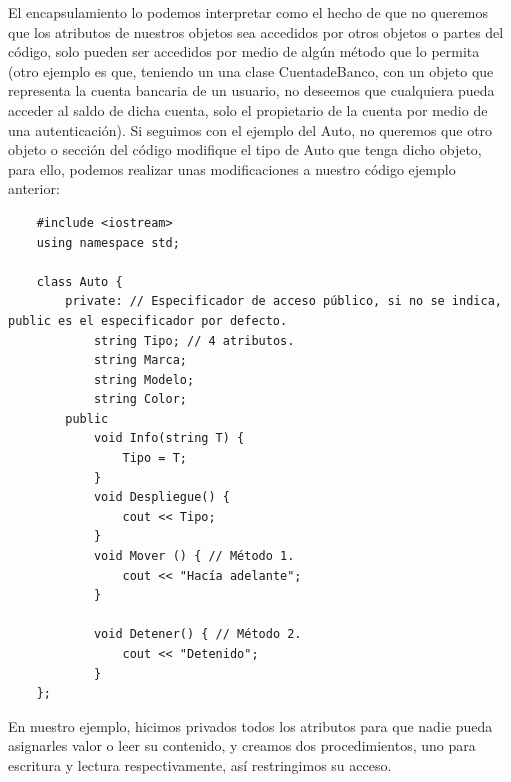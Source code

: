 El encapsulamiento lo podemos interpretar como el hecho de que no queremos que los atributos de nuestros objetos sea accedidos por otros objetos o partes del código, solo pueden ser accedidos por medio de algún método que lo permita (otro ejemplo es que, teniendo un una clase CuentadeBanco, con un objeto que representa la cuenta bancaria de un usuario, no deseemos que cualquiera pueda acceder al saldo de dicha cuenta, solo el propietario de la cuenta por medio de una autenticación). Si seguimos con el ejemplo del Auto, no queremos que otro objeto o sección del código modifique el tipo de Auto que tenga dicho objeto, para ello, podemos realizar unas modificaciones a nuestro código ejemplo anterior:
\begin{lstlisting}
    #include <iostream>
    using namespace std;
    
    class Auto {
        private: // Especificador de acceso público, si no se indica, public es el especificador por defecto.
            string Tipo; // 4 atributos.
            string Marca;
            string Modelo;
            string Color;
        public
            void Info(string T) {
                Tipo = T;
            }
            void Despliegue() {
                cout << Tipo;
            }
            void Mover () { // Método 1.
                cout << "Hacía adelante";
            }
            
            void Detener() { // Método 2.
                cout << "Detenido";
            }
    };
\end{lstlisting}

En nuestro ejemplo, hicimos privados todos los atributos para que nadie pueda asignarles valor o leer su contenido, y creamos dos procedimientos, uno para escritura y lectura respectivamente, así restringimos su acceso.

